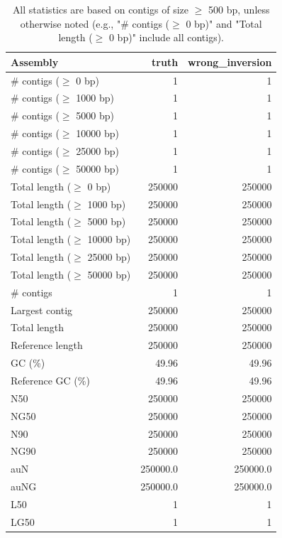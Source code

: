 \documentclass[12pt,a4paper]{article}
\begin{document}
\begin{table}[ht]
\begin{center}
\caption{All statistics are based on contigs of size $\geq$ 500 bp, unless otherwise noted (e.g., "\# contigs ($\geq$ 0 bp)" and "Total length ($\geq$ 0 bp)" include all contigs).}
\begin{tabular}{|l*{2}{|r}|}
\hline
Assembly & truth & wrong\_inversion \\ \hline
\# contigs ($\geq$ 0 bp) & 1 & 1 \\ \hline
\# contigs ($\geq$ 1000 bp) & 1 & 1 \\ \hline
\# contigs ($\geq$ 5000 bp) & 1 & 1 \\ \hline
\# contigs ($\geq$ 10000 bp) & 1 & 1 \\ \hline
\# contigs ($\geq$ 25000 bp) & 1 & 1 \\ \hline
\# contigs ($\geq$ 50000 bp) & 1 & 1 \\ \hline
Total length ($\geq$ 0 bp) & 250000 & 250000 \\ \hline
Total length ($\geq$ 1000 bp) & 250000 & 250000 \\ \hline
Total length ($\geq$ 5000 bp) & 250000 & 250000 \\ \hline
Total length ($\geq$ 10000 bp) & 250000 & 250000 \\ \hline
Total length ($\geq$ 25000 bp) & 250000 & 250000 \\ \hline
Total length ($\geq$ 50000 bp) & 250000 & 250000 \\ \hline
\# contigs & 1 & 1 \\ \hline
Largest contig & 250000 & 250000 \\ \hline
Total length & 250000 & 250000 \\ \hline
Reference length & 250000 & 250000 \\ \hline
GC (\%) & 49.96 & 49.96 \\ \hline
Reference GC (\%) & 49.96 & 49.96 \\ \hline
N50 & 250000 & 250000 \\ \hline
NG50 & 250000 & 250000 \\ \hline
N90 & 250000 & 250000 \\ \hline
NG90 & 250000 & 250000 \\ \hline
auN & 250000.0 & 250000.0 \\ \hline
auNG & 250000.0 & 250000.0 \\ \hline
L50 & 1 & 1 \\ \hline
LG50 & 1 & 1 \\ \hline

\end{tabular}
\end{center}
\end{table}
\end{document}
